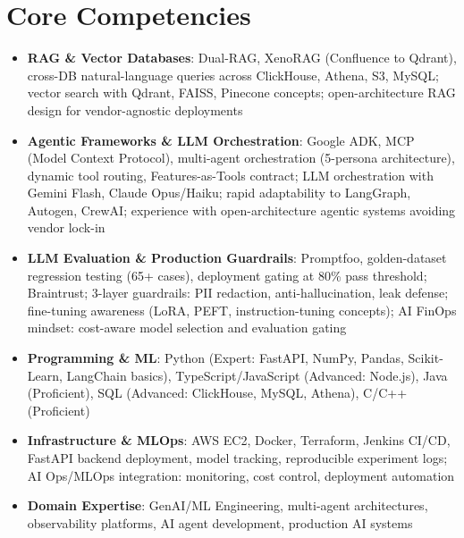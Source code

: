 \documentclass[11pt,a4paper,sans]{moderncv}
\begin{document}
\section{Core Competencies}
\vspace{1pt}
\begin{itemize}

\item \textbf{RAG \& Vector Databases}: Dual-RAG, XenoRAG (Confluence to Qdrant), cross-DB natural-language queries across ClickHouse, Athena, S3, MySQL; vector search with Qdrant, FAISS, Pinecone concepts; open-architecture RAG design for vendor-agnostic deployments

\item \textbf{Agentic Frameworks \& LLM Orchestration}: Google ADK, MCP (Model Context Protocol), multi-agent orchestration (5-persona architecture), dynamic tool routing, Features-as-Tools contract; LLM orchestration with Gemini Flash, Claude Opus/Haiku; rapid adaptability to LangGraph, Autogen, CrewAI; experience with open-architecture agentic systems avoiding vendor lock-in

\item \textbf{LLM Evaluation \& Production Guardrails}: Promptfoo, golden-dataset regression testing (65+ cases), deployment gating at 80\% pass threshold; Braintrust; 3-layer guardrails: PII redaction, anti-hallucination, leak defense; fine-tuning awareness (LoRA, PEFT, instruction-tuning concepts); AI FinOps mindset: cost-aware model selection and evaluation gating

\item \textbf{Programming \& ML}: Python (Expert: FastAPI, NumPy, Pandas, Scikit-Learn, LangChain basics), TypeScript/JavaScript (Advanced: Node.js), Java (Proficient), SQL (Advanced: ClickHouse, MySQL, Athena), C/C++ (Proficient)

\item \textbf{Infrastructure \& MLOps}: AWS EC2, Docker, Terraform, Jenkins CI/CD, FastAPI backend deployment, model tracking, reproducible experiment logs; AI Ops/MLOps integration: monitoring, cost control, deployment automation

\item \textbf{Domain Expertise}: GenAI/ML Engineering, multi-agent architectures, observability platforms, AI agent development, production AI systems

\end{itemize}

\end{document}
